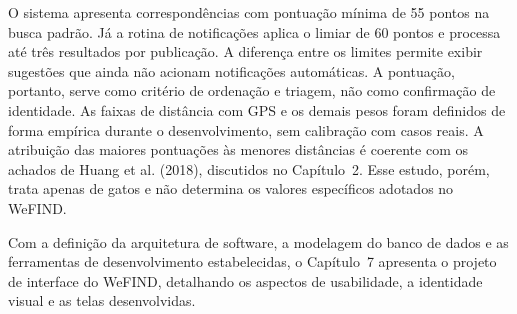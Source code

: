 O sistema apresenta correspondências com pontuação mínima de 55 pontos na busca padrão. Já a rotina de notificações aplica o limiar de 60 pontos e processa até três resultados por publicação. A diferença entre os limites permite exibir sugestões que ainda não acionam notificações automáticas. A pontuação, portanto, serve como critério de ordenação e triagem, não como confirmação de identidade. As faixas de distância com GPS e os demais pesos foram definidos de forma empírica durante o desenvolvimento, sem calibração com casos reais. A atribuição das maiores pontuações às menores distâncias é coerente com os achados de Huang et al. (2018), discutidos no Capítulo~2. Esse estudo, porém, trata apenas de gatos e não determina os valores específicos adotados no WeFIND.

Com a definição da arquitetura de software, a modelagem do banco de dados e as ferramentas de desenvolvimento estabelecidas, o Capítulo~7 apresenta o projeto de interface do WeFIND, detalhando os aspectos de usabilidade, a identidade visual e as telas desenvolvidas.

